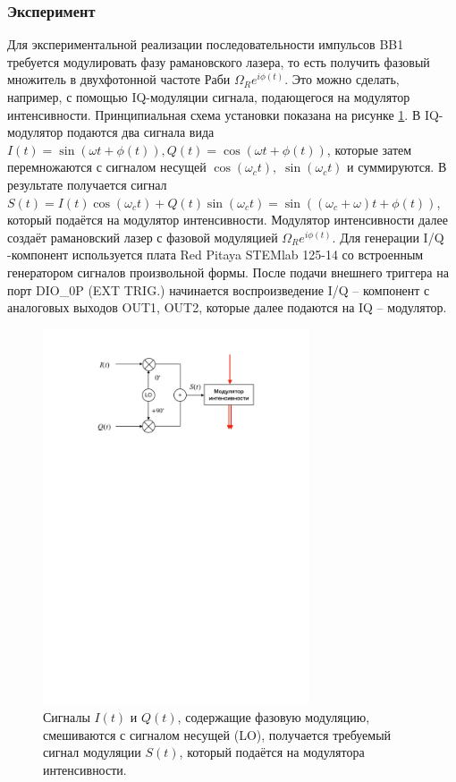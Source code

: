 \subsubsection{Эксперимент}

Для экспериментальной реализации последовательности импульсов BB1 требуется модулировать фазу рамановского лазера, то есть получить фазовый множитель в двухфотонной частоте Раби $\Omega_R e^{i\phi\left(t\right)}$. Это можно сделать, например, с помощью IQ-модуляции сигнала, подающегося на модулятор интенсивности. Принципиальная схема установки показана на рисунке \ref{fig:IQ_modulation}. В IQ-модулятор подаются два сигнала вида $I\left(t\right)=\sin\left(\omega t+\phi\left(t\right)\right), Q\left(t\right)=\cos\left(\omega t+\phi\left(t\right)\right)$, которые затем перемножаются с сигналом несущей $\cos\left(\omega_ct\right), \;  \sin\left(\omega_ct\right)$ и суммируются. В результате получается сигнал $S\left(t\right)=I\left(t\right)\cos\left(\omega_ct\right)+Q\left(t\right)\sin\left(\omega_ct\right)=\sin\left(\left(\omega_c+\omega\right)t+\phi\left(t\right)\right)$, который подаётся на модулятор интенсивности. Модулятор интенсивности далее создаёт рамановский лазер с фазовой модуляцией $\Omega_R e^{i\phi\left(t\right)}$. Для генерации I/Q -компонент используется плата Red Pitaya STEMlab 125-14 со встроенным генератором сигналов произвольной формы. После подачи внешнего триггера на порт DIO\_0P (EXT TRIG.) начинается воспроизведение I/Q – компонент с аналоговых выходов OUT1, OUT2, которые далее подаются на IQ – модулятор. 


\begin{figure}[H]
 	\centering
 	\includegraphics[width=0.7\textwidth]{images/IQ_modulation.pdf}
 	\caption{Сигналы $I(t)$ и $Q(t)$, содержащие фазовую модуляцию, смешиваются с сигналом несущей (LO), получается требуемый сигнал модуляции $S(t)$, который подаётся на модулятора интенсивности.}
 	\label{fig:IQ_modulation}
\end{figure} 

